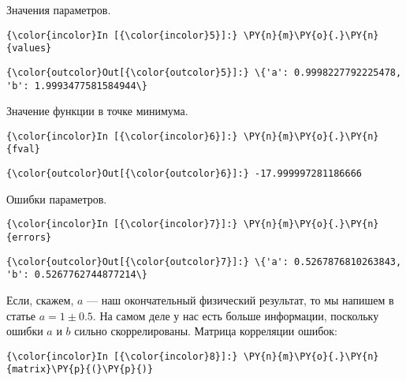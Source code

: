     Значения параметров.

    \begin{Verbatim}[commandchars=\\\{\}]
{\color{incolor}In [{\color{incolor}5}]:} \PY{n}{m}\PY{o}{.}\PY{n}{values}
\end{Verbatim}


\begin{Verbatim}[commandchars=\\\{\}]
{\color{outcolor}Out[{\color{outcolor}5}]:} \{'a': 0.9998227792225478, 'b': 1.9993477581584944\}
\end{Verbatim}
            
    Значение функции в точке минимума.

    \begin{Verbatim}[commandchars=\\\{\}]
{\color{incolor}In [{\color{incolor}6}]:} \PY{n}{m}\PY{o}{.}\PY{n}{fval}
\end{Verbatim}


\begin{Verbatim}[commandchars=\\\{\}]
{\color{outcolor}Out[{\color{outcolor}6}]:} -17.999997281186666
\end{Verbatim}
            
    Ошибки параметров.

    \begin{Verbatim}[commandchars=\\\{\}]
{\color{incolor}In [{\color{incolor}7}]:} \PY{n}{m}\PY{o}{.}\PY{n}{errors}
\end{Verbatim}


\begin{Verbatim}[commandchars=\\\{\}]
{\color{outcolor}Out[{\color{outcolor}7}]:} \{'a': 0.5267876810263843, 'b': 0.5267762744877214\}
\end{Verbatim}
            
    Если, скажем, \(a\) --- наш окончательный физический результат, то мы
напишем в статье \(a=1\pm0.5\). На самом деле у нас есть больше
информации, поскольку ошибки \(a\) и \(b\) сильно скоррелированы.
Матрица корреляции ошибок:

    \begin{Verbatim}[commandchars=\\\{\}]
{\color{incolor}In [{\color{incolor}8}]:} \PY{n}{m}\PY{o}{.}\PY{n}{matrix}\PY{p}{(}\PY{p}{)}
\end{Verbatim}


